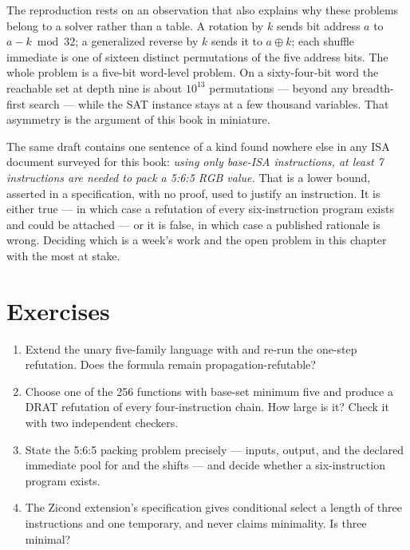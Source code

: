 The reproduction rests on an observation that also explains why these problems belong to a solver rather than a table. A rotation by \(k\) sends bit address \(a\) to \(a - k \bmod 32\); a generalized reverse by \(k\) sends it to \(a \oplus k\); each shuffle immediate is one of sixteen distinct permutations of the five address bits. The whole problem is a five-bit word-level problem. On a sixty-four-bit word the reachable set at depth nine is about \(10^{13}\) permutations --- beyond any breadth-first search --- while the SAT instance stays at a few thousand variables. That asymmetry is the argument of this book in miniature.

\begin{keyidea}[title={A specification that asserts a lower bound}]
The same draft contains one sentence of a kind found nowhere else in any ISA document surveyed for this book: \emph{using only base-ISA instructions, at least 7 instructions are needed to pack a 5:6:5 RGB value.} That is a lower bound, asserted in a specification, with no proof, used to justify an instruction. It is either true --- in which case a refutation of every six-instruction program exists and could be attached --- or it is false, in which case a published rationale is wrong. Deciding which is a week's work and the open problem in this chapter with the most at stake.
\end{keyidea}

\section{Exercises}

\begin{enumerate}
\item Extend the unary five-family language with  and re-run the one-step refutation. Does the formula remain propagation-refutable?
\item Choose one of the 256 functions with base-set minimum five and produce a DRAT refutation of every four-instruction chain. How large is it? Check it with two independent checkers.
\item State the 5:6:5 packing problem precisely --- inputs, output, and the declared immediate pool for  and the shifts --- and decide whether a six-instruction program exists.
\item The Zicond extension's specification gives conditional select a length of three instructions and one temporary, and never claims minimality. Is three minimal?
\end{enumerate}
